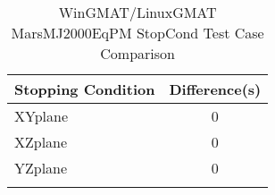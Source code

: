 \begin{table}[htbp!]
\centering
\caption{ WinGMAT/LinuxGMAT MarsMJ2000EqPM StopCond Test Case Comparison}
      \begin{tabular}{lc}
      \hline\hline
          Stopping Condition & Difference(s) \\
         \hline
         XYplane & 0 \\
         XZplane & 0 \\
         YZplane & 0 \\
      \hline\hline
      \label{Table: WinGMAT-LinuxGMAT MarsMJ2000EqPM StopCond Table} 
\end{tabular}
\end{table}
